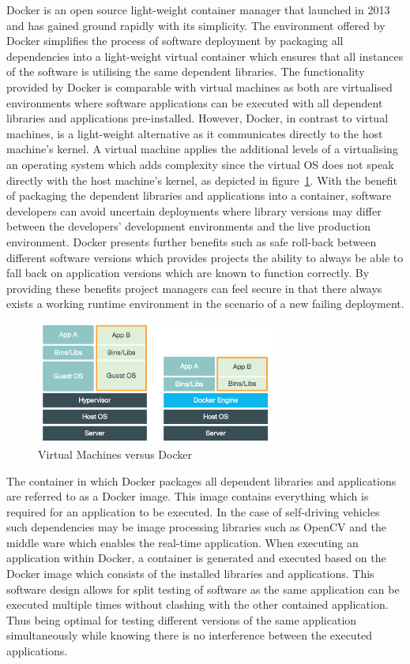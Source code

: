 Docker is an open source light-weight container manager that launched in 2013 and has gained ground rapidly with its simplicity. The environment offered by Docker simplifies the process of software deployment by packaging all dependencies into a light-weight virtual container which ensures that all instances of the software is utilising the same dependent libraries. The functionality provided by Docker is comparable with virtual machines as both are virtualised environments where software applications can be executed with all dependent libraries and applications pre-installed. However, Docker, in contrast to virtual machines, is a light-weight alternative as it communicates directly to the host machine's kernel. A virtual machine applies the additional levels of a virtualising an operating system which adds complexity since the virtual OS does not speak directly with the host machine's kernel, as depicted in figure~\ref{dockervm}. With the benefit of packaging the dependent libraries and applications into a container, software developers can avoid uncertain deployments where library versions may differ between the developers' development environments and the live production environment. Docker presents further benefits such as safe roll-back between different software versions which provides projects the ability to always be able to fall back on application versions which are known to function correctly. By providing these benefits project managers can feel secure in that there always exists a working runtime environment in the scenario of a new failing deployment.\\

\begin{figure}[ht]
\centering
     \includegraphics[width=0.7\textwidth]{./figure/dockervm.png}
      \caption{Virtual Machines versus Docker \cite{whatdocker}}
       \label{dockervm}
\end{figure}


The container in which Docker packages all dependent libraries and applications are referred to as a Docker image. This image contains everything which is required for an application to be executed. In the case of self-driving vehicles such dependencies may be image processing libraries such as OpenCV and the middle ware which enables the real-time application. When executing an application within Docker, a container is generated and executed based on the Docker image which consists of the installed libraries and applications. This software design allows for split testing of software as the same application can be executed multiple times without clashing with the other contained application. Thus being optimal for testing different versions of the same application simultaneously while knowing there is no interference between the executed applications.

